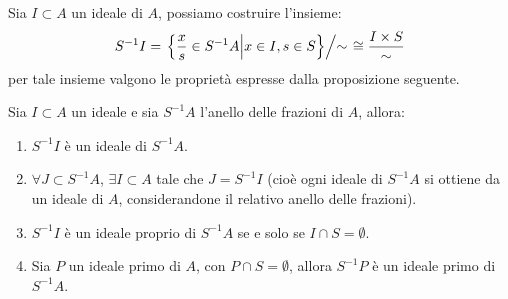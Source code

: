 \documentclass[11pt]{scrartcl}
\begin{document}
\begin{remark}
    [Ideali di $S^{-1}A$]
    Sia $I \subset A$ un ideale di $A$, possiamo costruire l'insieme:
    \[ S^{-1}I = \left.\left\{\frac{x}{s} \in S^{-1}A \middle| x \in I, s \in S \right\}\middle/ \sim \right.\cong \frac{I \times S}{\sim}
        \]
    per tale insieme valgono le proprietà espresse dalla proposizione seguente.
\end{remark}

\begin{proposition}
    [Ideali di $S^{-1}A$]
    Sia $I \subset A$ un ideale e sia $S^{-1}A$ l'anello delle frazioni di $A$, allora:
    \begin{enumerate}[(1)]
        \item $S^{-1}I$ è un ideale di $S^{-1}A$.
        \item $\forall J \subset S^{-1}A$, $\exists I \subset A$ tale che $J = S^{-1}I$ (cioè ogni ideale di $S^{-1}A$ si ottiene da un ideale di $A$, considerandone il relativo anello delle frazioni).
        \item $S^{-1}I$ è un ideale proprio di $S^{-1}A$ se e solo se $I \cap S = \emptyset$.
        \item Sia $P$ un ideale primo di $A$, con $P \cap S = \emptyset$, allora $S^{-1}P$ è un ideale primo di $S^{-1}A$.
    \end{enumerate}
\end{proposition}
\end{document}
